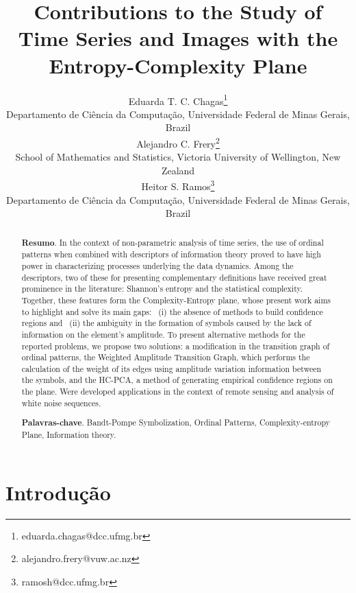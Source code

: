 \documentclass[a4,11pt]{pssbmac}
\begin{document}
\title{Contributions to the Study of Time Series and Images with the Entropy-Complexity Plane}

\author{
    {\large Eduarda T. C. Chagas}\thanks{eduarda.chagas@dcc.ufmg.br}\\
    {\small Departamento de Ci\^encia da Computa\c c\~ao, Universidade Federal de Minas Gerais, Brazil} \\
    {\large Alejandro C. Frery}\thanks{alejandro.frery@vuw.ac.nz} \\
    {\small School of Mathematics and Statistics, Victoria University of Wellington, New Zealand} \\
    {\large Heitor S. Ramos}\thanks{ramosh@dcc.ufmg.br} \\
    {\small Departamento de Ci\^encia da Computa\c c\~ao, Universidade Federal de Minas Gerais, Brazil} \\
}

\criartitulo

\begin{abstract}
{\bf Resumo}. In the context of non-parametric analysis of time series, the use of ordinal patterns when combined with descriptors of information theory proved to have high power in characterizing processes underlying the data dynamics.
Among the descriptors, two of these for presenting complementary definitions have received great prominence in the literature: Shannon's entropy and the statistical complexity.
Together, these features form the Complexity-Entropy plane, whose present work aims to highlight and solve its main gaps:
~(i) the absence of methods to build confidence regions and 
~(ii) the ambiguity in the formation of symbols caused by the lack of information on the element's amplitude.
To present alternative methods for the reported problems, we propose two solutions: a modification in the transition graph of ordinal patterns, the Weighted Amplitude Transition Graph, which performs the calculation of the weight of its edges using amplitude variation information between the symbols, and the HC-PCA, a method of generating empirical confidence regions on the plane.
Were developed applications in the context of remote sensing and analysis of white noise sequences. 

\noindent
{\bf Palavras-chave}. Bandt-Pompe Symbolization, Ordinal Patterns, Complexity-entropy Plane, Information theory.
\end{abstract}

\section{Introdução}
\end{document}
